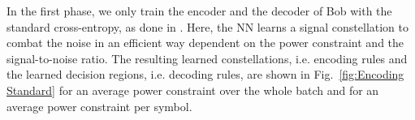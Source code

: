 \documentclass[conference]{IEEEtran}
\begin{document}
In the first phase, we only train the encoder and the decoder of Bob with the standard cross-entropy, as done in \cite{OShea2017}. Here, the NN learns a signal constellation to combat the noise in an efficient way dependent on the power constraint and the signal-to-noise ratio. The resulting learned constellations, i.e. encoding rules and the learned decision regions, i.e. decoding rules, are shown in Fig.~\ref{fig:Encoding Standard} for an average power constraint over the whole batch and for an average power constraint per symbol.

\begin{figure}
\end{figure}
\end{document}
